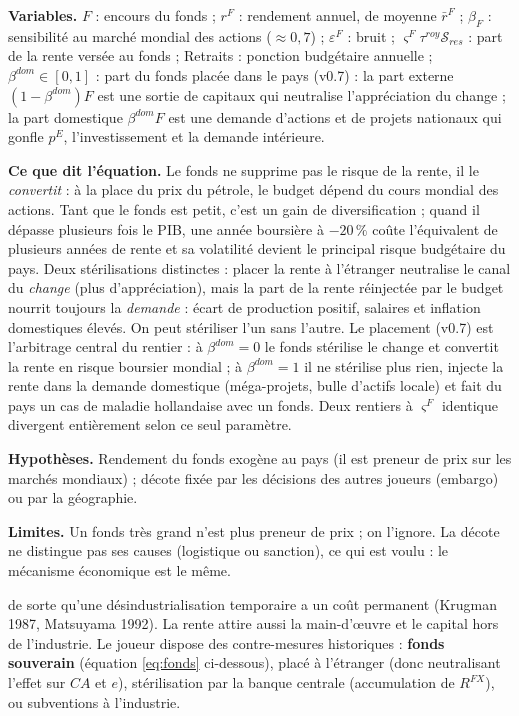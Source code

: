 \documentclass[11pt,a4paper]{article}
\newcommand{\variables}{\par\noindent\textbf{Variables.} }
\newcommand{\sens}{\par\noindent\textbf{Ce que dit l'équation.} }
\newcommand{\hyp}{\par\noindent\textbf{Hypothèses.} }
\newcommand{\limites}{\par\noindent\textbf{Limites.} }
\begin{document}
\begin{lecture}
\variables $F$ : encours du fonds ; $r^F$ : rendement annuel, de moyenne $\bar r^F$ ; $\beta_F$ : sensibilité au marché mondial des actions ($\approx0{,}7$) ; $\varepsilon^F$ : bruit ; $\varsigma^F\tau^{roy}\mathcal{S}_{res}$ : part de la rente versée au fonds ; Retraits : ponction budgétaire annuelle ; $\beta^{dom}\in[0,1]$ : part du fonds placée dans le pays (v0.7) : la part externe $(1-\beta^{dom})F$ est une sortie de capitaux qui neutralise l'appréciation du change ; la part domestique $\beta^{dom}F$ est une demande d'actions et de projets nationaux qui gonfle $p^E$, l'investissement et la demande intérieure.
\sens Le fonds ne supprime pas le risque de la rente, il le \emph{convertit} : à la place du prix du pétrole, le budget dépend du cours mondial des actions. Tant que le fonds est petit, c'est un gain de diversification ; quand il dépasse plusieurs fois le PIB, une année boursière à $-20\,\%$ coûte l'équivalent de plusieurs années de rente et sa volatilité devient le principal risque budgétaire du pays. Deux stérilisations distinctes : placer la rente à l'étranger neutralise le canal du \emph{change} (plus d'appréciation), mais la part de la rente réinjectée par le budget nourrit toujours la \emph{demande} : écart de production positif, salaires et inflation domestiques élevés. On peut stériliser l'un sans l'autre. Le placement (v0.7) est l'arbitrage central du rentier : à $\beta^{dom}=0$ le fonds stérilise le change et convertit la rente en risque boursier mondial ; à $\beta^{dom}=1$ il ne stérilise plus rien, injecte la rente dans la demande domestique (méga-projets, bulle d'actifs locale) et fait du pays un cas de maladie hollandaise avec un fonds. Deux rentiers à $\varsigma^F$ identique divergent entièrement selon ce seul paramètre.
\hyp Rendement du fonds exogène au pays (il est preneur de prix sur les marchés mondiaux) ; décote fixée par les décisions des autres joueurs (embargo) ou par la géographie.
\limites Un fonds très grand n'est plus preneur de prix ; on l'ignore. La décote ne distingue pas ses causes (logistique ou sanction), ce qui est voulu : le mécanisme économique est le même.
\end{lecture}

de sorte qu'une désindustrialisation temporaire a un coût permanent (Krugman 1987, Matsuyama 1992). La rente attire aussi la main-d'œuvre et le capital hors de l'industrie. Le joueur dispose des contre-mesures historiques : \textbf{fonds souverain} (équation \eqref{eq:fonds} ci-dessous), placé à l'étranger (donc neutralisant l'effet sur $CA$ et $e$), stérilisation par la banque centrale (accumulation de $R^{FX}$), ou subventions à l'industrie.
\end{document}
